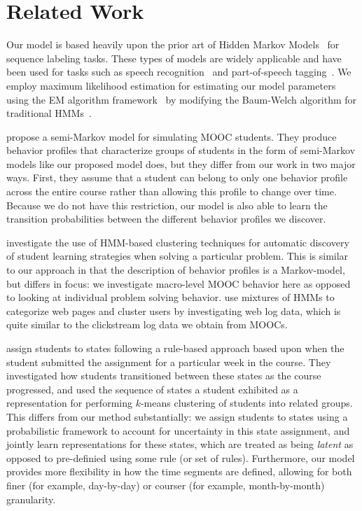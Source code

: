\section{Related Work}

Our model is based heavily upon the prior art of Hidden Markov
Models~\cite{Rabiner:1990:RSR} for sequence labeling tasks. These types of
models are widely applicable and have been used for tasks such as speech
recognition~\cite{Huang:1990:HMM} and part-of-speech
tagging~\cite{Jurafsky:2009:SLP}. We employ maximum likelihood estimation
for estimating our model parameters using the EM algorithm
framework~\cite{Dempster:1977:JRSS} by modifying the Baum-Welch algorithm
for traditional HMMs~\cite{Rabiner:1990:RSR}.

\citet{Faucon:2016:EDM} propose a semi-Markov model for simulating MOOC
students. They produce behavior profiles that characterize groups of
students in the form of semi-Markov models like our proposed model does,
but they differ from our work in two major ways. First, they assume that a
student can belong to only one behavior profile across the entire course
rather than allowing this profile to change over time.  Because we do not
have this restriction, our model is also able to learn the transition
probabilities between the different behavior profiles we discover.

\citet{Shih:2010:EDM} investigate the use of HMM-based clustering
techniques for automatic discovery of student learning strategies when
solving a particular problem. This is similar to our approach in that the
description of behavior profiles is a Markov-model, but differs in focus:
we investigate macro-level MOOC behavior here as opposed to looking at
individual problem solving behavior. \citet{Ypma:2002:Springer} use
mixtures of HMMs to categorize web pages and cluster users by investigating
web log data, which is quite similar to the clickstream log data we obtain
from MOOCs.

\citet{Kizilcec:2013:LAK} assign students  to states following a rule-based
approach based upon when the student submitted the assignment for a
particular week in the course. They investigated how students transitioned
between these states as the course progressed, and used the sequence of
states a student exhibited as a representation for performing $k$-means
clustering of students into related groups. This differs from our method
substantially: we assign students to states using a probabilistic
framework to account for uncertainty in this state assignment, and jointly
learn representations for these states, which are treated as being
\emph{latent} as opposed to pre-definied using some rule (or set of rules).
Furthermore, our model provides more flexibility in how the time segments
are defined, allowing for both finer (for example, day-by-day) or courser
(for example, month-by-month) granularity.
